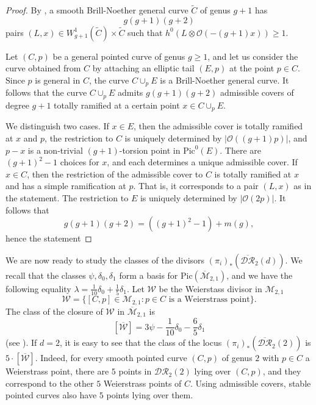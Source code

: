 \documentclass[10pt]{amsart}
\theoremstyle{definition}
\begin{document}
\begin{proof}
By \cite[Theorem B]{MR664324}, a smooth Brill-Noether general curve $\widetilde{C}$ of genus $g+1$ has 
\[
 g(g+1)(g+2)
\]
pairs $(L,x)\in W^1_{g+1}(\widetilde{C})\times \widetilde{C}$ such that $h^0(L\otimes \mathcal{O}(-(g+1)x))\geq 1$.

 Let $(C,p)$ be a general pointed curve of genus $g\geq 1$, and let us consider the curve obtained from $C$ by attaching an elliptic tail $(E,p)$ at the point $p\in C$. Since $p$ is general in $C$, the curve $C\cup_p E$ is a Brill-Noether general curve.  It follows that the curve $C\cup_p E$ admits $g(g+1)(g+2)$ admissible covers of degree $g+1$ totally ramified at a certain point $x\in C\cup_p E$. 

We distinguish two cases. If $x\in E$, then the admissible cover is totally ramified at $x$ and $p$, the restriction to $C$ is uniquely determined by $|\mathcal{O}((g+1)p)|$, and $p-x$ is a non-trivial $(g+1)$-torsion point in $\textrm{Pic}^0(E)$. There are $(g+1)^2-1$ choices for $x$, and each determines a unique admissible cover. If $x\in C$, then
the restriction of the admissible cover to $C$ is totally ramified at $x$ and has a simple ramification at $p$. That is, it corresponds to a pair $(L,x)$ as in the statement. The restriction to $E$ is uniquely determined by $|\mathcal{O}(2p)|$. It follows that
\[
  g(g+1)(g+2) = ((g+1)^2-1)+m(g),
\]
hence the statement
\end{proof}

We are now ready to study the classes of the divisors $(\pi_i)_*\left(\overline{\mathcal{DR}}_2(d)\right)$. We recall that the classes $\psi,\delta_0,\delta_1$ form a basis for $\textrm{Pic}({\overline{\mathcal{M}}}_{2,1})$, and we have the following equality $\lambda=\frac{1}{10}\delta_0+\frac{1}{5}\delta_1$.
Let $\mathcal{W}$ be the Weierstass divisor in ${\mathcal{M}}_{2,1}$
\[
 \mathcal{W} = \{[C,p]\in{\mathcal{M}}_{2,1}: p\in C \,\,\mbox{is a Weierstrass point}\}.
\]
The class of the closure of $\mathcal{W}$ in ${\overline{\mathcal{M}}}_{2,1}$ is
\[
\left[\overline{\mathcal{W}}\right]=3\psi-\frac{1}{10}\delta_0-\frac{6}{5}\delta_1
\]
(see \cite[Theorem 2.2]{MR910206}). If $d=2$, it is easy to see that the class of the locus $(\pi_i)_*\left( \overline{\mathcal{DR}}_2(2) \right)$ is $5\cdot \left[\overline{\mathcal{W}} \right]$. Indeed, for every smooth pointed curve $(C,p)$ of genus $2$ with $p\in C$ a Weierstrass point, there are $5$ points in ${\mathcal{DR}}_2(2)$ lying over $(C,p)$, and they correspond to the other $5$ Weierstrass points of $C$. Using admissible covers, stable pointed curves also have $5$ points lying over them.
\end{document}
